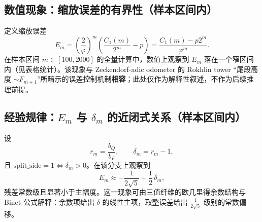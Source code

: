 \subsection{数值现象：缩放误差的有界性（样本区间内）}

定义缩放误差
$$
E_m=\left(\frac{2}{\varphi}\right)^m\left(\frac{C_1(m)}{2^m}-p\right)=\frac{C_1(m)-p2^m}{\varphi^m}.
$$
在样本区间 $m\in[100,2000]$ 的全量计算中，数值上观察到 $E_m$ 落在一个窄区间内（见表格统计）。该现象与 Zeckendorf-adic odometer 的 Rokhlin tower “尾段高度 $\sim F_{m+1}$”所暗示的误差控制机制\textbf{相容}；此处仅作为解释性叙述，不作为后续推理前提。

\begin{table}[H]
\centering
\resizebox{\linewidth}{!}{}
\caption{Dyadic 计数的代表性取值（表内 $C_1(m)$ 仅展示前缀与位数；完整数值在 artifacts 的 CSV 中）。}
\end{table}

\begin{table}[H]
\centering

\caption{$m\in[100,2000]$ 上 $\delta_m$ 与 $E_m$ 的范围（由脚本自动生成）。}
\end{table}

\subsection{经验规律：\texorpdfstring{$E_m$}{E\_m} 与 \texorpdfstring{$\delta_m$}{delta\_m} 的近闭式关系（样本区间内）}

设
$$
r_m=\frac{b_Q}{b_F},\qquad \delta_m=r_m-1,
$$
且 $\mathrm{split\_side}=1\iff \delta_m>0$。在该分支上观察到
$$
E_m\approx -\frac{1}{2\sqrt5}+\frac12\,\delta_m,
$$
残差常数级且显著小于主幅度。这一现象可由三值纤维的欧几里得余数结构与 Binet 公式解释：余数项给出 $\delta$ 的线性主项，取整误差给出 $\frac{1}{2\sqrt5}$ 级别的常数偏移。

